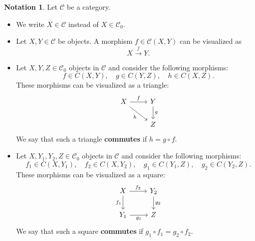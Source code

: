 \documentclass[a4paper,10pt]{scrartcl}
\theoremstyle{plain}
\theoremstyle{definition}
\newtheorem{nota}[thm]{Notation}
\newcommand{\Cat}[1]{\mathcal{#1}}
\newcommand{\CC}{\Cat{C}}
\newcommand{\Ob}[1]{{#1}_0}
\newcommand{\CHom}[3]{{#1}(#2,#3)}
\newcommand{\co}[2]{\ensuremath{#2 \circ #1}}
\begin{document}
\begin{nota} Let $\CC$ be a category.
\begin{itemize}
\item We write $X\in\CC$ instead of $X\in \Ob{\CC}$. 
\item Let $X,Y\in \CC$ be objects. A morphism $f\in\CHom{\CC}{X}{Y}$ can be visualized as \[ X \xrightarrow{f} Y. \]
\item Let $X,Y, Z \in \Ob{\CC}$ objects in $\CC$ and consider the following morphisms:
\[
f\in\CHom{C}{X}{Y}, \quad g\in\CHom{C}{Y}{Z}, \quad h\in\CHom{C}{X}{Z}.
\]
These morphisms can be visualized as a triangle:
\[
\begin{tikzcd}
X \arrow[r, "f"] \arrow[dr,swap, "h"] & Y \arrow[d, "g"] \\
& Z
\end{tikzcd}
\]
We say that such a triangle \textbf{commutes} if $h = \co{f}{g}$.
\item Let $X,Y_1,Y_2, Z \in \Ob{\CC}$ objects in $\CC$ and consider the following morphisms:
\[
f_1\in\CHom{C}{X}{Y_1}, \quad f_2\in\CHom{C}{X}{Y_2}, \quad g_1\in\CHom{C}{Y_1}{Z}, \quad g_2\in\CHom{C}{Y_2}{Z}.
\]
These morphisms can be visualized as a square:
\[
\begin{tikzcd}
X \arrow[r, "f_2"] \arrow[d,swap, "f_1"] & Y_2 \arrow[d, "g_2"] \\
Y_1 \arrow[r, swap, "g_1"] & Z 
\end{tikzcd}
\]
We say that such a square \textbf{commutes} if $\co{f_1}{g_1} = \co{f_2}{g_2}$.
\end{itemize}
\end{nota}
\end{document}
